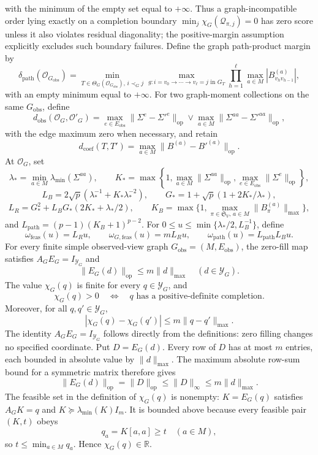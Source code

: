 with the minimum of the empty set equal to \(+\infty\).  Thus a graph-incompatible order lying exactly on a completion boundary \(\min_j\chi_G(\mathcal Q_{\pi,j})=0\) has zero score unless it also violates residual diagonality; the positive-margin assumption explicitly excludes such boundary failures.
Define the graph path-product margin by
\[
\delta_{\mathrm{path}}(\mathcal O_{G_{\mathrm{obs}}})=
\min_{T\in\Theta_G(\mathcal O_{G_{\mathrm{obs}}}),\,i\prec_G j}
\max_{g:i=v_0\to\cdots\to v_\ell=j\text{ in }G_T}
\prod_{h=1}^{\ell}\max_{a\in M}|B_{v_hv_{h-1}}^{(a)}|,
\]
with an empty minimum equal to \(+\infty\).
For two graph-moment collections on the same \(G_{\mathrm{obs}}\), define
\[
d_{\mathrm{obs}}(\mathcal O_G,\mathcal O'_G)=
\max_{e\in E_{\mathrm{obs}}}\|\Sigma^e-\Sigma'^e\|_{\mathrm{op}}
\vee
\max_{a\in M}\|\Sigma^{aa}-\Sigma'^{aa}\|_{\mathrm{op}},
\]
with the edge maximum zero when necessary, and retain
\[
d_{\mathrm{coef}}(T,T')=\max_{a\in M}\|B^{(a)}-B'^{(a)}\|_{\mathrm{op}}.
\]
At \(\mathcal O_G\), set
\[
\lambda_*=\min_{a\in M}\lambda_{\min}(\Sigma^{aa}),
\qquad
K_*=\max\left\{1,\max_{a\in M}\|\Sigma^{aa}\|_{\mathrm{op}},
\max_{e\in E_{\mathrm{obs}}}\|\Sigma^e\|_{\mathrm{op}}\right\},
\]
\[
L_B=2\sqrt p(\lambda_*^{-1}+K_*\lambda_*^{-2}),
\qquad
G_*=1+\sqrt p(1+2K_*/\lambda_*),
\]
\[
L_R=G_*^2+L_BG_*(2K_*+\lambda_*/2),
\qquad
K_B=\max\{1,\max_{\pi\in\mathfrak S_V,\,a\in M}\|B_\pi^{(a)}\|_{\max}\},
\]
and \(L_{\mathrm{path}}=(p-1)(K_B+1)^{p-2}\).  For \(0\le u\le\min\{\lambda_*/2,L_B^{-1}\}\), define
\[
\omega_{\mathrm{feas}}(u)=L_Ru,
\qquad
\omega_{G,\mathrm{feas}}(u)=mL_Ru,
\qquad
\omega_{\mathrm{path}}(u)=L_{\mathrm{path}}L_Bu.
\]
For every finite simple observed-view graph \(G_{\mathrm{obs}}=(M,E_{\mathrm{obs}})\), the zero-fill map satisfies \(A_GE_G=I_{\mathcal Y_G}\) and
\[
\|E_G(d)\|_{\mathrm{op}}\le m\|d\|_{\max}
\quad(d\in\mathcal Y_G).
\]
The value \(\chi_G(q)\) is finite for every \(q\in\mathcal Y_G\), and
\[
\chi_G(q)>0
\quad\Longleftrightarrow\quad
q\text{ has a positive-definite completion}.
\]
Moreover, for all \(q,q'\in\mathcal Y_G\),
\[
|\chi_G(q)-\chi_G(q')|\le m\|q-q'\|_{\max}.
\]
The identity \(A_GE_G=I_{\mathcal Y_G}\) follows directly from the definitions: zero filling changes no specified coordinate.  Put \(D=E_G(d)\).  Every row of \(D\) has at most \(m\) entries, each bounded in absolute value by \(\|d\|_{\max}\).  The maximum absolute row-sum bound for a symmetric matrix therefore gives
\[
\|E_G(d)\|_{\mathrm{op}}=\|D\|_{\mathrm{op}}
\le\|D\|_{\infty}
\le m\|d\|_{\max}.
\tag{1}
\]
The feasible set in the definition of \(\chi_G(q)\) is nonempty: \(K=E_G(q)\) satisfies \(A_GK=q\) and \(K\succeq\lambda_{\min}(K)I_m\).  It is bounded above because every feasible pair \((K,t)\) obeys
\[
q_a=K[a,a]\ge t
\quad(a\in M),
\tag{2}
\]
so \(t\le\min_{a\in M}q_a\).  Hence \(\chi_G(q)\in\mathbb R\).

